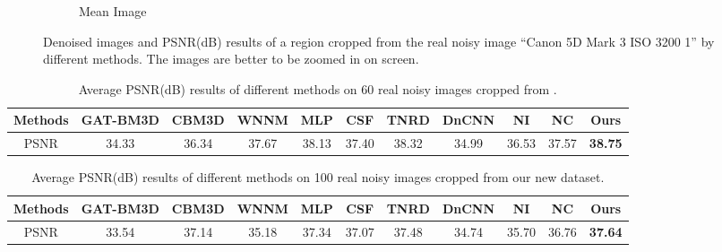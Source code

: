 \begin{figure}
\begin{subfigure}[t]{0.19\textwidth}
\caption{Mean Image}
    \end{subfigure}
    \caption{Denoised images and PSNR(dB) results of a region cropped from the real noisy image ``Canon 5D Mark 3 ISO 3200 1'' \cite{crosschannel2016} by different methods. The images are better to be zoomed in on screen.}
    \label{fig9}
\end{figure}




\begin{table}\vspace{-4mm}
\small
\caption{Average PSNR(dB) results of different methods on 60 real noisy images cropped from \cite{crosschannel2016}.}
\vspace{-4mm}
\label{tab3}
\begin{center}
\renewcommand\arraystretch{1}
\begin{tabular}{|c||c|c|c|c|c|c|c|c|c|c|}
\hline
Methods
&\textbf{GAT-BM3D}
&\textbf{CBM3D}
&\textbf{WNNM}
&\textbf{MLP}
&\textbf{CSF} 
&\textbf{TNRD} 
&\textbf{DnCNN}
&\textbf{NI} 
&\textbf{NC} 
&\textbf{Ours} 
\\
\hline
PSNR  
& 34.33 & 36.34 & 37.67 & 38.13 & 37.40 & 38.32 & 34.99 & 36.53 & 37.57 & \textbf{38.75}
\\
\hline
\end{tabular}
\end{center}
\end{table}



\begin{table}\vspace{-4mm}
\small
\caption{Average PSNR(dB) results of different methods on 100 real noisy images cropped from our new dataset.}
\vspace{-4mm}
\label{tab4}
\begin{center}
\renewcommand\arraystretch{1}
\begin{tabular}{|c||c|c|c|c|c|c|c|c|c|c|}
\hline
Methods
&\textbf{GAT-BM3D}
&\textbf{CBM3D}
&\textbf{WNNM}
&\textbf{MLP}
&\textbf{CSF} 
&\textbf{TNRD} 
&\textbf{DnCNN}
&\textbf{NI} 
&\textbf{NC} 
&\textbf{Ours} 
\\
\hline
PSNR  
& 33.54 & 37.14 & 35.18 & 37.34 & 37.07 & 37.48 & 34.74 & 35.70 & 36.76 & \textbf{37.64}
\\
\hline
\end{tabular}
\end{center}
\end{table}

